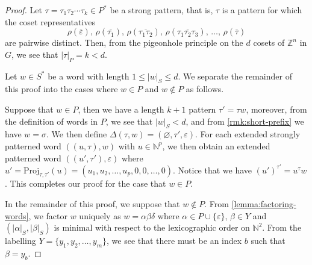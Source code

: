 \begin{proof}

Let $\tau = \tau_1 \tau_2 \cdots \tau_k \in P^*$ be a strong pattern, that is, $\tau$ is a pattern for which the coset representatives
\[
	\rho(\overline{\varepsilon}),\,
	\rho(\overline{\tau_1}),\,
	\rho(\overline{\tau_1 \tau_2}),\,
	\rho(\overline{\tau_1 \tau_2 \tau_3}),\,
	\ldots,\,
	\rho(\overline{\tau})
\]
are pairwise distinct.
Then, from the pigeonhole principle on the $d$ cosets of $\mathbb{Z}^n$ in $G$, we see that $|\tau|_P = k < d$.

Let $w \in S^*$ be a word with length $1 \leqslant |w|_S \leqslant d$.
We separate the remainder of this proof into the cases where $w \in P$ and $w \notin P$ as follows.

Suppose that $w \in P$, then we have a length $k+1$ pattern $\tau' = \tau w$,
moreover, from the definition of words in $P$, we see that $|w|_S < d$, and from \cref{rmk:short-prefix} we have $w = \sigma$.
We then define $\Delta(\tau,w) = (\varnothing, \tau', \varepsilon)$.
For each extended strongly patterned word $((u,\tau),w)$ with $u \in \mathbb{N}^p$, we then obtain an extended patterned word $((u',\tau'),\varepsilon)$ where $u' = \mathrm{Proj}_{\tau,\tau'}(u) = (u_1,u_2,\ldots,u_p,0,0,\ldots,0)$.
Notice that we have $(u')^{\tau'} = u^\tau w$.
This completes our proof for the case that $w \in P$.

In the remainder of this proof, we suppose that $w \notin P$.
From \cref{lemma:factoring-words}, we factor $w$ uniquely as $w = \alpha\beta\delta$ where $\alpha \in P \cup \{\varepsilon\}$, $\beta \in Y$ and $(|\alpha|_S,|\beta|_S)$ is minimal with respect to the lexicographic order on $\mathbb{N}^2$.
From the labelling $Y = \{y_1,y_2,\ldots,y_m\}$, we see that there must be an index $b$ such that $\beta = y_b$.


\end{proof}
